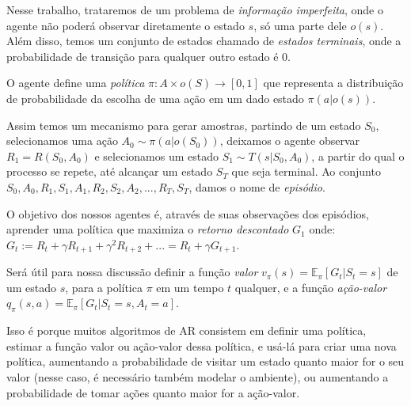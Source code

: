 Nesse trabalho, trataremos de um problema de \textit{informação imperfeita},
onde o agente não poderá observar diretamente o estado $s$,
só uma parte dele $o(s)$. 
Além disso, temos um conjunto de estados chamado de \textit{estados terminais},
onde a probabilidade de transição para qualquer outro estado é 0.

O agente define uma \textit{política} $\pi: A \times o(S) \to [0, 1]$ 
que representa a distribuição de probabilidade da escolha de uma ação em um dado estado $\pi(a | o(s))$.

Assim temos um mecanismo para gerar amostras, 
partindo de um estado $S_0$,
selecionamos uma ação $A_0 \sim \pi(a | o(S_0))$,
deixamos o agente observar $R_1 = R(S_0, A_0)$
e selecionamos um estado $S_1 \sim T(s | S_0, A_0)$,
a partir do qual o processo se repete,
até alcançar um estado $S_T$ que seja terminal.
Ao conjunto 
$S_0, A_0, R_1, S_1, A_1, R_2, S_2, A_2, ..., R_T, S_T$,
damos o nome de \textit{episódio}.

O objetivo dos nossos agentes é, 
através de suas observações dos episódios, 
aprender uma política que maximiza o \textit{retorno descontado} $G_1$ onde:
$G_t := R_t + \gamma R_{t + 1} + \gamma^2R_{t + 2} + ... = R_t + \gamma G_{t + 1}$.

Será útil para nossa discussão definir a função \textit{valor} $v_{\pi}(s) = \mathbb{E}_{\pi}[G_t | S_t = s]$
de um estado $s$, para a política $\pi$ em um tempo $t$ qualquer,
e a função \textit{ação-valor} $q_{\pi}(s, a) = \mathbb{E}_{\pi}[G_t | S_t = s, A_t = a]$.

Isso é porque muitos algoritmos de AR consistem em definir uma política,
estimar a função valor ou ação-valor dessa política, e usá-lá para criar uma nova política,
aumentando a probabilidade de visitar um estado quanto maior for o seu valor (nesse caso, é necessário também modelar o ambiente),
ou aumentando a probabilidade de tomar ações quanto maior for a ação-valor.